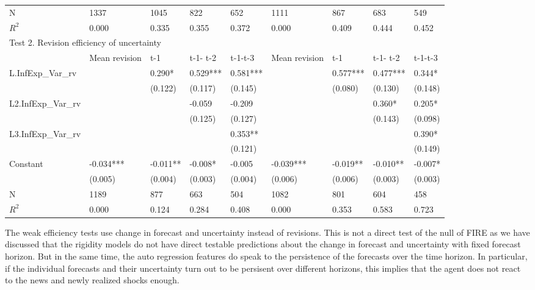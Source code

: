 \documentclass[]{article}
\begin{document}
\begin{table}[ht]
\begin{adjustbox}{angle=90}
\begin{tabular}{lllllllll}
		\hline 
		N                   & 1337          & 1045      & 822      & 652      & 1111          & 867       & 683       & 549       \\
		$R^2$                  & 0.000         & 0.335     & 0.355    & 0.372    & 0.000         & 0.409     & 0.444     & 0.452     \\
		\hline 
		\multicolumn{9}{l}{Test 2. Revision efficiency of uncertainty}                                                            \\
		\hline 
		& Mean revision & t-1       & t-1- t-2 & t-1-t-3  & Mean revision & t-1       & t-1- t-2  & t-1-t-3   \\
		\hline 
		L.InfExp\_Var\_rv   &               & 0.290*    & 0.529*** & 0.581*** &               & 0.577***  & 0.477***  & 0.344*    \\
		&               & (0.122)   & (0.117)  & (0.145)  &               & (0.080)   & (0.130)   & (0.148)   \\
		L2.InfExp\_Var\_rv  &               &           & -0.059   & -0.209   &               &           & 0.360*    & 0.205*    \\
		&               &           & (0.125)  & (0.127)  &               &           & (0.143)   & (0.098)   \\
		L3.InfExp\_Var\_rv  &               &           &          & 0.353**  &               &           &           & 0.390*    \\
		&               &           &          & (0.121)  &               &           &           & (0.149)   \\
		Constant              & -0.034***     & -0.011**  & -0.008*  & -0.005   & -0.039***     & -0.019**  & -0.010**  & -0.007*   \\
		& (0.005)       & (0.004)   & (0.003)  & (0.004)  & (0.006)       & (0.006)   & (0.003)   & (0.003)   \\
		\hline 
		N                   & 1189          & 877       & 663      & 504      & 1082          & 801       & 604       & 458       \\
	$R^2$                 & 0.000         & 0.124     & 0.284    & 0.408    & 0.000         & 0.353     & 0.583     & 0.723    \\
		\hline 
	\end{tabular}
\end{adjustbox}
\end{table}

The weak efficiency tests use change in forecast and uncertainty instead of revisions. This is not a direct test of the null of FIRE as we have discussed that the rigidity models do not have direct testable predictions about the change in forecast and uncertainty with fixed forecast horizon. But in the same time, the auto regression features do speak to the persistence of the forecasts over the time horizon. In particular, if the individual forecasts and their uncertainty turn out to be persisent over different horizons, this implies that the agent does not react to the news and newly realized shocks enough. 
\end{document}
